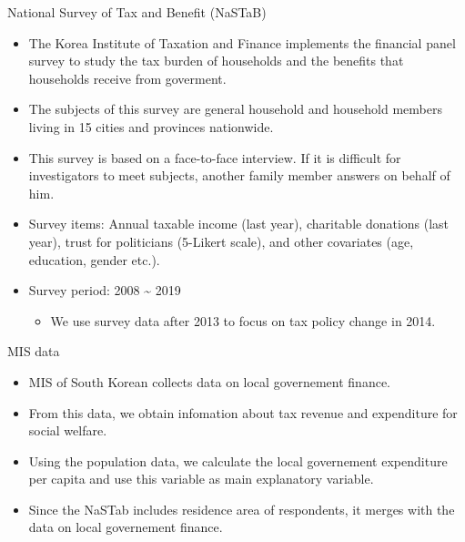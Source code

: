 \documentclass[
  ignorenonframetext,
]{beamer}
\providecommand{\tightlist}{%
  \setlength{\itemsep}{0pt}\setlength{\parskip}{0pt}}
\begin{document}
\begin{frame}{National Survey of Tax and Benefit (NaSTaB)}
\protect\hypertarget{national-survey-of-tax-and-benefit-nastab}{}
\begin{itemize}
\tightlist
\item
  The Korea Institute of Taxation and Finance implements the financial
  panel survey to study the tax burden of households and the benefits
  that households receive from goverment.
\item
  The subjects of this survey are general household and household
  members living in 15 cities and provinces nationwide.
\item
  This survey is based on a face-to-face interview. If it is difficult
  for investigators to meet subjects, another family member answers on
  behalf of him.
\item
  Survey items: Annual taxable income (last year), charitable donations
  (last year), trust for politicians (5-Likert scale), and other
  covariates (age, education, gender etc.).
\item
  Survey period: 2008 \textasciitilde{} 2019

  \begin{itemize}
  \tightlist
  \item
    We use survey data after 2013 to focus on tax policy change in 2014.
  \end{itemize}
\end{itemize}
\end{frame}

\begin{frame}{MIS data}
\protect\hypertarget{mis-data}{}
\begin{itemize}
\tightlist
\item
  MIS of South Korean collects data on local governement finance.
\item
  From this data, we obtain infomation about tax revenue and expenditure
  for social welfare.
\item
  Using the population data, we calculate the local governement
  expenditure per capita and use this variable as main explanatory
  variable.
\item
  Since the NaSTab includes residence area of respondents, it merges
  with the data on local governement finance.
\end{itemize}
\end{frame}
\end{document}
